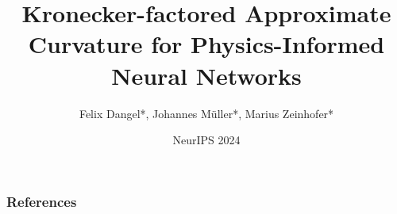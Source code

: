 \documentclass[12pt,usepdftitle=false,aspectratio=169]{beamer}
\title{%
  Kronecker-factored Approximate Curvature for Physics-Informed Neural Networks
}
\author{Felix Dangel*, Johannes M\"uller*, Marius Zeinhofer*}
\date{NeurIPS 2024}
\begin{document}
\makeTitleSlide





% 
% 
% 
% 

\begin{frame}[allowframebreaks]
  \frametitle{References}

  {\footnotesize
    
    
  }
\end{frame}
\end{document}
